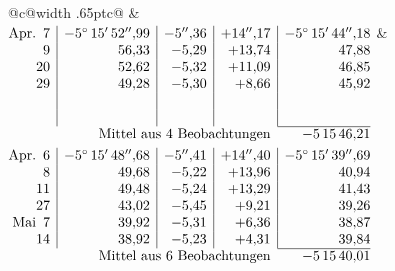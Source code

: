 \noindent\begin{tabular}{@{}c@{\hspace{.4em}\vrule width .65pt\hspace{.4em}}c@{}}
 &
 \\[.18ex]
\(\begin{array}[t]{@{}r|r|r|r|r@{}}
\text{Apr.}\enspace 7 & -5^\circ\,15'\,52''{,}99 & -5''{,}36 & +14''{,}17 & -5^\circ\,15'\,44''{,}18\\
9 & 56{,}33 & -5{,}29 & +13{,}74 & 47{,}88\\
20 & 52{,}62 & -5{,}32 & +11{,}09 & 46{,}85\\
29 & 49{,}28 & -5{,}30 & +8{,}66 & 45{,}92\\
 & & & & \\
 & & & & \\
\cline{5-5}
\multicolumn{4}{r}{\text{Mittel aus 4 Beobachtungen}} & -5\,15\,46{,}21
\end{array}\)
&
\(\begin{array}[t]{@{}r|r|r|r|r@{}}
\text{Apr.}\enspace 6 & -5^\circ\,15'\,48''{,}68 & -5''{,}41 & +14''{,}40 & -5^\circ\,15'\,39''{,}69\\
8 & 49{,}68 & -5{,}22 & +13{,}96 & 40{,}94\\
11 & 49{,}48 & -5{,}24 & +13{,}29 & 41{,}43\\
27 & 43{,}02 & -5{,}45 & +9{,}21 & 39{,}26\\
\text{Mai}\enspace 7 & 39{,}92 & -5{,}31 & +6{,}36 & 38{,}87\\
14 & 38{,}92 & -5{,}23 & +4{,}31 & 39{,}84\\
\cline{5-5}
\multicolumn{4}{r}{\text{Mittel aus 6 Beobachtungen}} & -5\,15\,40{,}01
\end{array}\)
\end{tabular}\par\medskip
